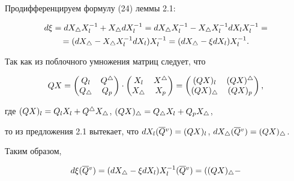 \begin{pf} Продифференцируем формулу (24) леммы 2.1:


\begin{multline*}


d\xi = dX_\tri X_l^{-1}+X_\tri dX_l^{-1}=dX_\tri X_l^{-1}-X_\tri


X_l^{-1}dX_lX_l^{-1}=\\


=(dX_\tri -X_\tri X_l^{-1}dX_l)X_l^{-1}=(dX_\tri -\xi dX_l)X_l^{-1}.


\end{multline*}


Так как из поблочного умножения матриц следует, что


$$


QX=


\begin{pmatrix}


Q_l & Q^\tri \\


Q_\tri & Q_p


\end{pmatrix}


\cdot


\begin{pmatrix}


X_l & X^\tri \\


X_\tri & X_p


\end{pmatrix}


=


\begin{pmatrix}


(QX)_l & (QX)^\tri \\


(QX)_\tri & (QX)_p


\end{pmatrix}


,


$$


где $(QX)_l=Q_lX_l+Q^\triangle X_\triangle $, $(QX)_\triangle =Q_\triangle X_l+Q_pX_\triangle $,


то из предложения 2.1 вытекает, что $dX_l(\olv Q)=(QX)_l$, $dX_\tri (\olv


Q)=(QX)_\tri $.


Таким образом,


\begin{gather*}


d\xi(\olv Q)=(dX_\tri -\xi dX_l)X_l^{-1}(\olv Q)=((QX)_\tri -



\end{gather*}
\end{pf}
